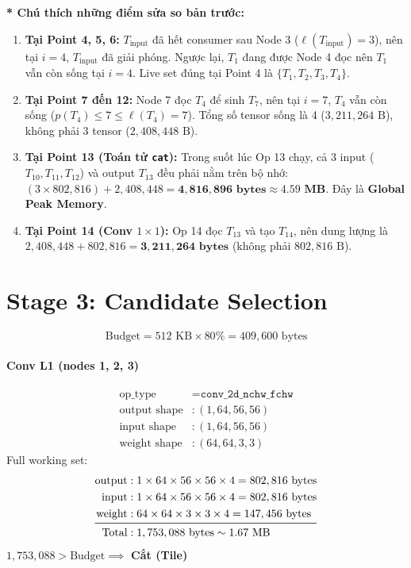 \documentclass[11pt,a4paper]{article}
\begin{document}
\textbf{\textcolor{highlightblue}{* Chú thích những điểm sửa so bản trước:}}
\begin{enumerate}
    \item \textbf{Tại Point 4, 5, 6:} $T_{\text{input}}$ đã hết consumer sau Node 3 ($\ell(T_{\text{input}}) = 3$), nên tại $i=4$, $T_{\text{input}}$ đã giải phóng. Ngược lại, $T_1$ đang được Node 4 đọc nên $T_1$ vẫn còn sống tại $i=4$. Live set đúng tại Point 4 là $\{T_1, T_2, T_3, T_4\}$.
    \item \textbf{Tại Point 7 đến 12:} Node 7 đọc $T_4$ để sinh $T_7$, nên tại $i=7$, $T_4$ vẫn còn sống ($p(T_4)\le 7 \le \ell(T_4)=7$). Tổng số tensor sống là 4 ($3,211,264\text{ B}$), không phải 3 tensor ($2,408,448\text{ B}$).
    \item \textbf{Tại Point 13 (Toán tử \texttt{cat}):} Trong suốt lúc Op 13 chạy, cả 3 input ($T_{10}, T_{11}, T_{12}$) và output $T_{13}$ đều phải nằm trên bộ nhớ: $(3 \times 802,816) + 2,408,448 = \mathbf{4,816,896\text{ bytes}} \approx \mathbf{4.59\text{ MB}}$. Đây là \textbf{Global Peak Memory}.
    \item \textbf{Tại Point 14 (Conv $1\times 1$):} Op 14 đọc $T_{13}$ và tạo $T_{14}$, nên dung lượng là $2,408,448 + 802,816 = \mathbf{3,211,264\text{ bytes}}$ (không phải $802,816\text{ B}$).
\end{enumerate}

\section{Stage 3: Candidate Selection}

$$\text{Budget} = 512\text{ KB} \times 80\% = 409,600\text{ bytes}$$

\paragraph{Conv L1 (nodes 1, 2, 3)}
\begin{align*}
\text{op\_type} &= \texttt{conv\_2d\_nchw\_fchw} \\
\text{output shape} &: (1, 64, 56, 56) \\
\text{input shape} &: (1, 64, 56, 56) \\
\text{weight shape} &: (64, 64, 3, 3)
\end{align*}
Full working set:
\begin{align*}
\text{output} &: 1 \times 64 \times 56 \times 56 \times 4 = 802,816\text{ bytes} \\
\text{input} &: 1 \times 64 \times 56 \times 56 \times 4 = 802,816\text{ bytes} \\
\text{weight} &: 64 \times 64 \times 3 \times 3 \times 4 = 147,456\text{ bytes} \\
\midrule
\text{Total} &: 1,753,088\text{ bytes} \sim 1.67\text{ MB}
\end{align*}
$1,753,088 > \text{Budget} \implies$ \textbf{Cắt (Tile)}
\end{document}
